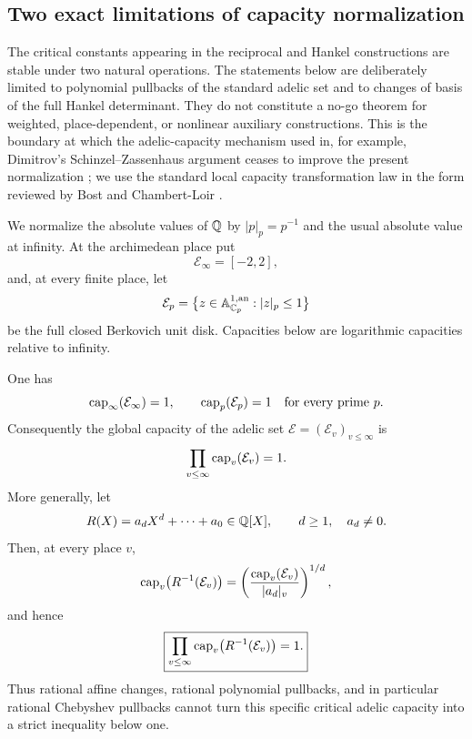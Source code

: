 \subsection{Two exact limitations of capacity normalization}
\label{subsec:capacity-pullback-limitations}

The critical constants appearing in the reciprocal and Hankel constructions
are stable under two natural operations.  The statements below are deliberately
limited to polynomial pullbacks of the standard adelic set and to changes of
basis of the full Hankel determinant.  They do not constitute a no-go theorem
for weighted, place-dependent, or nonlinear auxiliary constructions.  This is
the boundary at which the adelic-capacity mechanism used in, for example,
Dimitrov's Schinzel--Zassenhaus argument ceases to improve the present
normalization \cite{Dimitrov2019}; we use the standard local capacity
transformation law in the form reviewed by Bost and Chambert-Loir
\cite{BostChambertLoir2009}.

We normalize the absolute values of \(\mathbb Q\) by
\(|p|_p=p^{-1}\) and the usual absolute value at infinity.  At the
archimedean place put
\[
 \mathcal E_\infty=[-2,2],
\]
and, at every finite place, let
\[
 \mathcal E_p=
 \bigl\{z\in\mathbb A_{\mathbb C_p}^{1,\mathrm{an}}:|z|_p\leq1\bigr\}
\]
be the full closed Berkovich unit disk.  Capacities below are logarithmic
capacities relative to infinity.

\begin{proposition}
\label{prop:adelic-polynomial-capacity}
One has
\[
 \operatorname{cap}_\infty(\mathcal E_\infty)=1,
 \qquad
 \operatorname{cap}_p(\mathcal E_p)=1
 \quad\text{for every prime }p.
\]
Consequently the global capacity of the adelic set
\(\mathcal E=(\mathcal E_v)_{v\leq\infty}\) is
\[
 \prod_{v\leq\infty}\operatorname{cap}_v(\mathcal E_v)=1.
\]
More generally, let
\[
 R(X)=a_dX^d+\cdots+a_0\in\mathbb Q[X],
 \qquad d\geq1,\quad a_d\ne0.
\]
Then, at every place \(v\),
\begin{equation}\label{eq:local-capacity-pullback}
 \operatorname{cap}_v\bigl(R^{-1}(\mathcal E_v)\bigr)
 =
 \left(
   \frac{\operatorname{cap}_v(\mathcal E_v)}{|a_d|_v}
 \right)^{1/d},
\end{equation}
and hence
\begin{equation}\label{eq:global-capacity-pullback}
 \boxed{
 \prod_{v\leq\infty}
 \operatorname{cap}_v\bigl(R^{-1}(\mathcal E_v)\bigr)=1.}
\end{equation}
Thus rational affine changes, rational polynomial pullbacks, and in
particular rational Chebyshev pullbacks cannot turn this specific critical
adelic capacity into a strict inequality below one.
\end{proposition}

